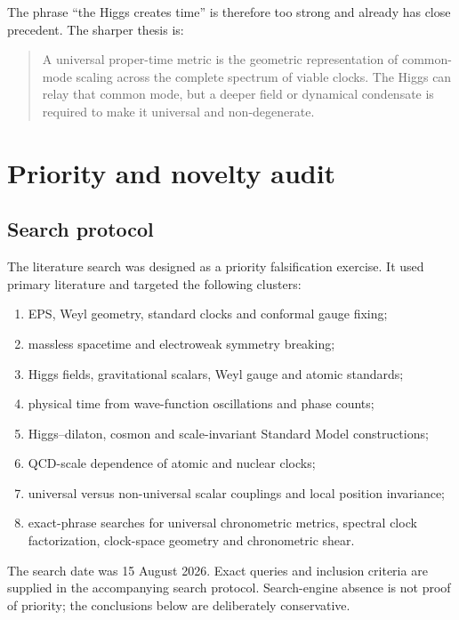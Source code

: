 \documentclass[11pt,a4paper]{article}
\begin{document}
The phrase ``the Higgs creates time'' is therefore too strong and already has close precedent. The sharper thesis is:

\begin{quote}
A universal proper-time metric is the geometric representation of common-mode scaling across the complete spectrum of viable clocks. The Higgs can relay that common mode, but a deeper field or dynamical condensate is required to make it universal and non-degenerate.
\end{quote}

\section{Priority and novelty audit}

\subsection{Search protocol}

The literature search was designed as a priority falsification exercise. It used primary literature and targeted the following clusters:

\begin{enumerate}
  \item EPS, Weyl geometry, standard clocks and conformal gauge fixing;
  \item massless spacetime and electroweak symmetry breaking;
  \item Higgs fields, gravitational scalars, Weyl gauge and atomic standards;
  \item physical time from wave-function oscillations and phase counts;
  \item Higgs--dilaton, cosmon and scale-invariant Standard Model constructions;
  \item QCD-scale dependence of atomic and nuclear clocks;
  \item universal versus non-universal scalar couplings and local position invariance;
  \item exact-phrase searches for universal chronometric metrics, spectral clock factorization, clock-space geometry and chronometric shear.
\end{enumerate}

The search date was 15 August 2026. Exact queries and inclusion criteria are supplied in the accompanying search protocol. Search-engine absence is not proof of priority; the conclusions below are deliberately conservative.
\end{document}
